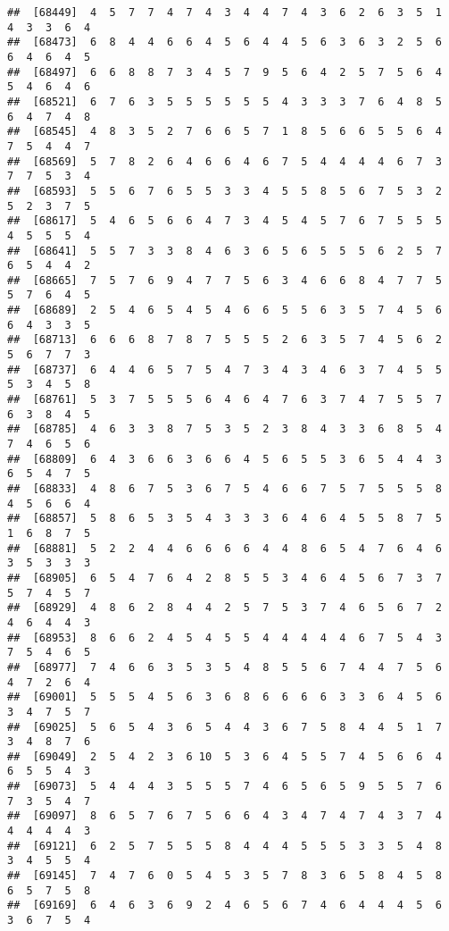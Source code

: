 \documentclass[
]{book}
\begin{document}
\begin{verbatim}
##  [68449]  4  5  7  7  4  7  4  3  4  4  7  4  3  6  2  6  3  5  1  4  3  3  6  4
##  [68473]  6  8  4  4  6  6  4  5  6  4  4  5  6  3  6  3  2  5  6  6  4  6  4  5
##  [68497]  6  6  8  8  7  3  4  5  7  9  5  6  4  2  5  7  5  6  4  5  4  6  4  6
##  [68521]  6  7  6  3  5  5  5  5  5  5  4  3  3  3  7  6  4  8  5  6  4  7  4  8
##  [68545]  4  8  3  5  2  7  6  6  5  7  1  8  5  6  6  5  5  6  4  7  5  4  4  7
##  [68569]  5  7  8  2  6  4  6  6  4  6  7  5  4  4  4  4  6  7  3  7  7  5  3  4
##  [68593]  5  5  6  7  6  5  5  3  3  4  5  5  8  5  6  7  5  3  2  5  2  3  7  5
##  [68617]  5  4  6  5  6  6  4  7  3  4  5  4  5  7  6  7  5  5  5  4  5  5  5  4
##  [68641]  5  5  7  3  3  8  4  6  3  6  5  6  5  5  5  6  2  5  7  6  5  4  4  2
##  [68665]  7  5  7  6  9  4  7  7  5  6  3  4  6  6  8  4  7  7  5  5  7  6  4  5
##  [68689]  2  5  4  6  5  4  5  4  6  6  5  5  6  3  5  7  4  5  6  6  4  3  3  5
##  [68713]  6  6  6  8  7  8  7  5  5  5  2  6  3  5  7  4  5  6  2  5  6  7  7  3
##  [68737]  6  4  4  6  5  7  5  4  7  3  4  3  4  6  3  7  4  5  5  5  3  4  5  8
##  [68761]  5  3  7  5  5  5  6  4  6  4  7  6  3  7  4  7  5  5  7  6  3  8  4  5
##  [68785]  4  6  3  3  8  7  5  3  5  2  3  8  4  3  3  6  8  5  4  7  4  6  5  6
##  [68809]  6  4  3  6  6  3  6  6  4  5  6  5  5  3  6  5  4  4  3  6  5  4  7  5
##  [68833]  4  8  6  7  5  3  6  7  5  4  6  6  7  5  7  5  5  5  8  4  5  6  6  4
##  [68857]  5  8  6  5  3  5  4  3  3  3  6  4  6  4  5  5  8  7  5  1  6  8  7  5
##  [68881]  5  2  2  4  4  6  6  6  6  4  4  8  6  5  4  7  6  4  6  3  5  3  3  3
##  [68905]  6  5  4  7  6  4  2  8  5  5  3  4  6  4  5  6  7  3  7  5  7  4  5  7
##  [68929]  4  8  6  2  8  4  4  2  5  7  5  3  7  4  6  5  6  7  2  4  6  4  4  3
##  [68953]  8  6  6  2  4  5  4  5  5  4  4  4  4  4  6  7  5  4  3  7  5  4  6  5
##  [68977]  7  4  6  6  3  5  3  5  4  8  5  5  6  7  4  4  7  5  6  4  7  2  6  4
##  [69001]  5  5  5  4  5  6  3  6  8  6  6  6  6  3  3  6  4  5  6  3  4  7  5  7
##  [69025]  5  6  5  4  3  6  5  4  4  3  6  7  5  8  4  4  5  1  7  3  4  8  7  6
##  [69049]  2  5  4  2  3  6 10  5  3  6  4  5  5  7  4  5  6  6  4  6  5  5  4  3
##  [69073]  5  4  4  4  3  5  5  5  7  4  6  5  6  5  9  5  5  7  6  7  3  5  4  7
##  [69097]  8  6  5  7  6  7  5  6  6  4  3  4  7  4  7  4  3  7  4  4  4  4  4  3
##  [69121]  6  2  5  7  5  5  5  8  4  4  4  5  5  5  3  3  5  4  8  3  4  5  5  4
##  [69145]  7  4  7  6  0  5  4  5  3  5  7  8  3  6  5  8  4  5  8  6  5  7  5  8
##  [69169]  6  4  6  3  6  9  2  4  6  5  6  7  4  6  4  4  4  5  6  3  6  7  5  4

\end{verbatim}
\end{document}
